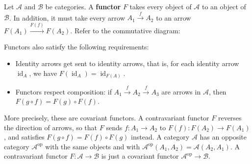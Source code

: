 \begin{definition}[Functors]
    Let $\mathcal{A}$ and $\mathcal{B}$ be categories. A \textbf{functor} $F$ takes every object of $\mathcal{A}$ to an object of $\mathcal{B}$. In addition, it must take every arrow $A_1 \overset{f}{\to }A_2$ to an arrow $F(A_1)\overset{F(f)}{\longrightarrow }F(A_2).$ Refer to the commutative diagram:
            \begin{figure}[H]
                \centering
            \end{figure}
        Functors also satisfy the following requirements:
        \begin{itemize}
            \item Identity arrows get sent to identity arrows, that is, for each identity arrow $\operatorname{id}_A$, we have $F(\operatorname{id}_A)=\operatorname{id}_{F(A)}$.
            \item Functors respect composition: if $A_1\overset{f}{\to }A_2\overset{f}{\to }A_3$ are arrows in $\mathcal{A}$, then $F(g\circ f)=F(g)\circ F(f)$.
        \end{itemize}
\end{definition}
More precisely, these are covariant functors. A contravariant functor $F$ reverses the direction of arrows, so that $F$ sends $f \colon A_1 \to A_2$ to $F(f) \colon F(A_2) \to F(A_1)$, and satisfies $F(g\circ f)=F(f)\circ F(g)$ instead. A category $\mathcal{A}$ has an opposite category $\mathcal{A}^{\text{op}}$ with the same objects and with $\mathcal{A}^{\text{op}}(A_1,A_2)=\mathcal{A}(A_2,A_1)$. A contravariant functor $F \colon \mathcal{A} \to \mathcal{B}$ is just a covariant functor $\mathcal{A}^{\text{op}}\to \mathcal{B}$. 

